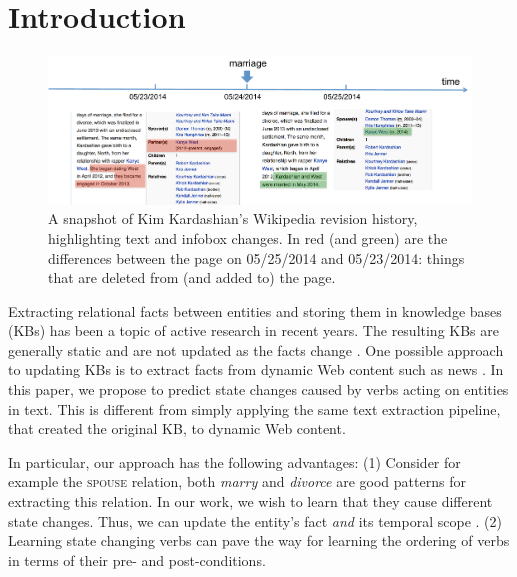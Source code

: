 \section{Introduction}

\begin{figure}[t]
\begin{center}
\includegraphics[width=16cm,keepaspectratio=true]{figures/motivation.pdf}
\caption{\label{fig:motivation} A snapshot of Kim Kardashian's Wikipedia revision history, highlighting text and infobox changes. In red (and green) are the differences between the page on 05/25/2014 and 05/23/2014: things that are deleted from (and  added to) the page.}
\end{center}
\end{figure}

Extracting relational facts between entities and storing them in knowledge bases (KBs) has been a topic of active research in recent years. The resulting  KBs  are generally static  and are not updated as the facts change  \cite{suchanek2007yago,carlson2010toward,fader2011identifying,MitchellCHTBCMG15}. 
One possible approach to   updating KBs is to extract facts from dynamic Web content such as news \cite{nakashole2012real}. 
In this  paper, we propose to predict state changes caused by  verbs acting on entities in text. This is different from simply applying the same text extraction pipeline, that created the original KB, to dynamic Web content.

In particular,  our approach has the following advantages: (1) Consider for example the \textsc{spouse} relation, both \textit{marry} and \textit{divorce} are good patterns for extracting this relation. In our work, we wish to learn that they cause different state changes.
Thus,  we can update the entity's fact \textit{and} its temporal scope \cite{wijayactp}. (2) Learning state changing verbs
   can pave the way for learning the ordering of verbs in terms of their  pre- and post-conditions.
   
